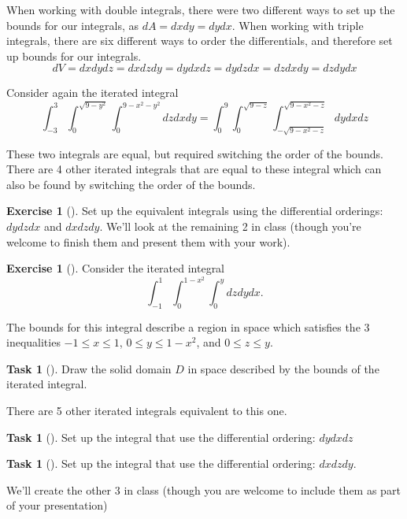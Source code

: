 \documentclass[10pt,]{book}
\theoremstyle{plain}
\theoremstyle{definition}
\theoremstyle{definition}
\theoremstyle{definition}
\theoremstyle{definition}
\newtheorem{exploration}[project]{Exercise}
\newtheorem{task}[project]{Task}
\theoremstyle{definition}
\numberwithin{equation}{section}
\newcommand{\ds}{\displaystyle}
\begin{document}
When working with double integrals, there were two different ways to set up the bounds for our integrals, as \(dA=dxdy=dydx\). When working with triple integrals, there are six different ways to order the differentials, and therefore set up bounds for our integrals.%
\begin{equation*}
dV=dxdydz = dxdzdy = dydxdz=dydzdx=dzdxdy=dzdydx
\end{equation*}
%
\par
Consider again the iterated integral%
\begin{equation*}
\ds \int_{-3}^3 \int_0^{\sqrt{9-y^2}}\int_0^{9-x^2-y^2} dzdxdy = \int_0^9\int_0^{\sqrt{9-z}}\int_{-\sqrt{9-x^2-z}}^{\sqrt{9-x^2-z}} dydxdz
\end{equation*}
%
\par
These two integrals are equal, but required switching the order of the bounds. There are 4 other iterated integrals that are equal to these integral which can also be found by switching the order of the bounds.%
\begin{exploration}[]\label{exploration-297}
Set up the equivalent integrals using the differential orderings: \(dydzdx\) and \(dxdzdy\). We'll look at the remaining 2 in class (though you're welcome to finish them and present them with your work).%
\end{exploration}
\begin{exploration}[]\label{exploration-298}
Consider the iterated integral%
\begin{equation*}
\int_{-1}^1\int_0^{1-x^2}\int_0^{y} dzdydx.
\end{equation*}
%
\par
The bounds for this integral describe a region in space which satisfies the 3 inequalities \(-1\leq x\leq 1\), \(0\leq y\leq 1-x^2\), and \(0\leq z\leq y\).%
\begin{task}[]\label{task-811}
Draw the solid domain \(D\) in space described by the bounds of the iterated integral.%
\end{task}
There are 5 other iterated integrals equivalent to this one.%
\begin{task}[]\label{task-812}
Set up the integral that use the differential ordering: \(dydxdz\)%
\end{task}
\begin{task}[]\label{task-813}
Set up the integral that use the differential ordering: \(dxdzdy\).%
\end{task}
We'll create the other 3 in class (though you are welcome to include them as part of your presentation)%
\end{exploration}
\end{document}
